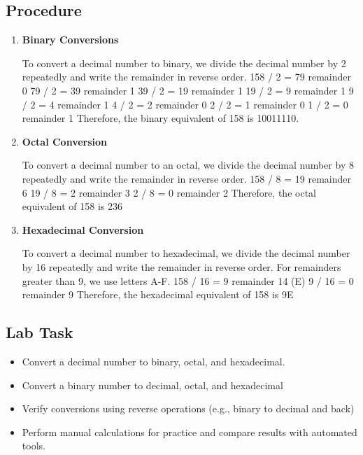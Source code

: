 \documentclass[a4paper,9pt]{article}
\begin{document}
\subsection{Procedure}
\begin{enumerate}
	\item \textbf{Binary Conversions}
	
	To convert a decimal number to binary, we divide the decimal number by 2 repeatedly and write the remainder
	in reverse order.
	158 / 2 = 79 remainder 0 79 / 2 = 39 remainder 1 39 / 2 = 19 remainder 1 19 / 2 = 9 remainder 1 9 / 2 =
	4 remainder 1 4 / 2 = 2 remainder 0 2 / 2 = 1 remainder 0 1 / 2 = 0 remainder 1
	Therefore, the binary equivalent of 158 is 10011110.
	
	\item \textbf{Octal Conversion}
	
	To convert a decimal number to an octal, we divide the decimal number by 8 repeatedly and write the remainder
	in reverse order.
	158 / 8 = 19 remainder 6 19 / 8 = 2 remainder 3 2 / 8 = 0 remainder 2
	Therefore, the octal equivalent of 158 is 236
	
	\item \textbf{Hexadecimal Conversion}
	
	To convert a decimal number to hexadecimal, we divide the decimal number by 16 repeatedly and write the
	remainder in reverse order. For remainders greater than 9, we use letters A-F.
	158 / 16 = 9 remainder 14 (E) 9 / 16 = 0 remainder 9
	Therefore, the hexadecimal equivalent of 158 is 9E
	
	
\end{enumerate}

\subsection{Lab Task}

\begin{itemize}
	\item Convert a decimal number to binary, octal, and hexadecimal.
	\item Convert a binary number to decimal, octal, and hexadecimal
	\item Verify conversions using reverse operations (e.g., binary to decimal and back)
	\item Perform manual calculations for practice and compare results with automated tools.
\end{itemize}
\end{document}
